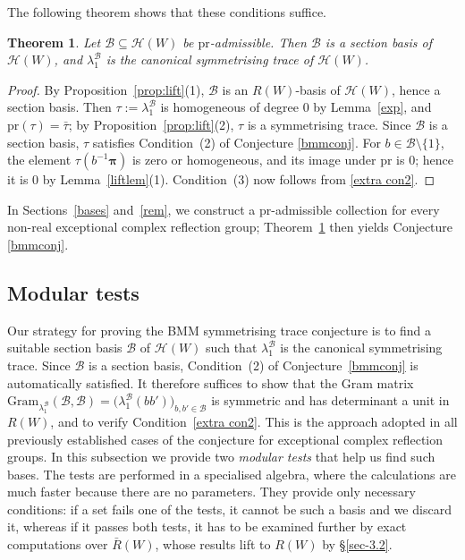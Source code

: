\documentclass[11pt, reqno]{amsart}
\newcommand{\gram}{\mathrm{Gram}}
\newcommand{\cB}{\mathcal{B}}
\newcommand{\cH}{\mathcal{H}}
\numberwithin{equation}{section}
\newtheorem{theorem}{Theorem}[section]
\theoremstyle{remark}
\begin{document}
The following theorem shows that these conditions suffice.

\begin{theorem}\label{thm:liftall}
Let $\mathcal B\subseteq\mathcal H(W)$ be $\mathrm{pr}$-admissible. Then
$\mathcal B$ is a section basis of $\mathcal H(W)$, and
$\lambda_1^{\mathcal B}$ is the canonical symmetrising trace of
$\mathcal H(W)$.
\end{theorem}


\begin{proof}
By Proposition~\ref{prop:lift}(1), $\mathcal B$ is an $R(W)$-basis of
$\mathcal H(W)$, hence a section basis. Then
$\tau:=\lambda_1^{\mathcal B}$ is homogeneous of degree $0$ by
Lemma~\ref{exp}, and $\mathrm{pr}(\tau)=\bar\tau$; by
Proposition~\ref{prop:lift}(2), $\tau$ is a symmetrising trace. Since
$\mathcal B$ is a section basis, $\tau$ satisfies Condition~(2)
of Conjecture \ref{bmmconj}. For $b\in\mathcal B\setminus\{1\}$, the element
$\tau(b^{-1}\boldsymbol\pi)$ is zero or homogeneous, and its image
under $\mathrm{pr}$ is $0$; hence it is $0$ by Lemma~\ref{liftlem}(1).
Condition~(3) now follows from \eqref{extra con2}.
\end{proof}



In Sections~\ref{bases} and~\ref{rem}, we construct a $\mathrm{pr}$-admissible
collection for every non-real exceptional complex reflection group;
Theorem~\ref{thm:liftall} then yields Conjecture \ref{bmmconj}.

\subsection{Modular tests}\label{modtests}
	
	Our strategy for proving the BMM symmetrising trace conjecture is to find a suitable section basis $\cB$ of $\cH(W)$  such that $\lambda_1^{\cB}$ is the canonical symmetrising trace. Since $\cB$ is a section basis, Condition~(2) of Conjecture~\ref{bmmconj} is automatically satisfied. It therefore suffices to show that the Gram matrix $\gram_{\lambda^{\cB}_1}(\cB,\cB)=\bigl(\lambda_1^{\cB}(bb')\bigr)_{b,b'\in\cB}$	is symmetric and has determinant a unit in $R(W)$, and to verify Condition~\eqref{extra con2}. This is the approach adopted in all previously established cases of the conjecture for exceptional complex reflection groups.  In this subsection we provide two \emph{modular tests}
	that help us find such bases. The tests are performed in a specialised algebra,
	where the calculations are much faster because there are no parameters. They
	provide only necessary conditions: if a set fails one of the tests, it cannot be
	such a basis and we discard it, whereas if it passes both tests, it has to be examined further by exact computations over $\bar R(W)$, whose results lift to $R(W)$ by \S \ref{sec-3.2}.
	
\end{document}
